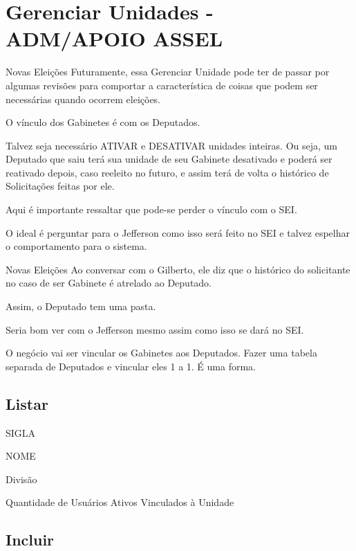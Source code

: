 	

\section{Gerenciar Unidades \msrln - ADM/APOIO ASSEL}


	\begin{nota}{Novas Eleições}
		Futuramente, essa Gerenciar Unidade pode ter de passar por algumas revisões para comportar a característica de coisas que podem ser necessárias quando ocorrem eleições.
		
		O vínculo dos Gabinetes é com os Deputados.
		
		Talvez seja necessário ATIVAR e DESATIVAR unidades inteiras. Ou seja, um Deputado que saiu terá sua unidade de seu Gabinete desativado e poderá ser reativado depois, caso reeleito no futuro, e assim terá de volta o histórico de Solicitações feitas por ele.
		
		Aqui é importante ressaltar que pode-se perder o vínculo com o SEI.
		
		O ideal é perguntar para o Jefferson como isso será feito no SEI e talvez espelhar o comportamento para o sistema.				
	\end{nota}
		
		
	\begin{nota}{Novas Eleições}		
		Ao conversar com o Gilberto, ele diz que o histórico do solicitante no caso de ser Gabinete é atrelado ao Deputado. 
		
		Assim, o Deputado tem uma pasta. 
		
		Seria bom ver com o Jefferson mesmo assim como isso se dará no SEI.
	\end{nota}

	
	
	O negócio vai ser vincular os Gabinetes aos Deputados. Fazer uma tabela separada de Deputados e vincular eles 1 a 1. É uma forma.	


	\subsection{Listar}
	
	SIGLA
	
	NOME
	
	Divisão
	
	Quantidade de Usuários Ativos Vinculados à Unidade
	
	
	\subsection{Incluir}
	
